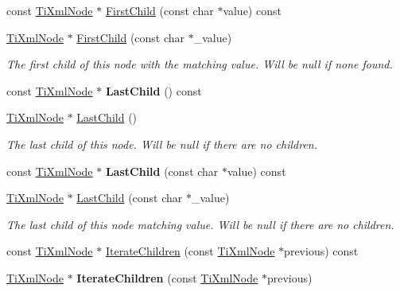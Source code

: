 \begin{DoxyCompactItemize}
\item 
const \hyperlink{classTiXmlNode}{Ti\+Xml\+Node} $\ast$ \hyperlink{classTiXmlNode_ab5f722624113c8203227de4f56576d31}{First\+Child} (const char $\ast$value) const 
\item 
\hyperlink{classTiXmlNode}{Ti\+Xml\+Node} $\ast$ \hyperlink{classTiXmlNode_abc8bf32be6419ec453a731868de19554}{First\+Child} (const char $\ast$\+\_\+value)\hypertarget{classTiXmlNode_abc8bf32be6419ec453a731868de19554}{}\label{classTiXmlNode_abc8bf32be6419ec453a731868de19554}

\begin{DoxyCompactList}\small\item\em The first child of this node with the matching \textquotesingle{}value\textquotesingle{}. Will be null if none found. \end{DoxyCompactList}\item 
const \hyperlink{classTiXmlNode}{Ti\+Xml\+Node} $\ast$ {\bfseries Last\+Child} () const \hypertarget{classTiXmlNode_a6d671107e00cca1d28cb2d7f3a87a21e}{}\label{classTiXmlNode_a6d671107e00cca1d28cb2d7f3a87a21e}

\item 
\hyperlink{classTiXmlNode}{Ti\+Xml\+Node} $\ast$ \hyperlink{classTiXmlNode_a6432d2b2495f6caf9cb4278df706a031}{Last\+Child} ()\hypertarget{classTiXmlNode_a6432d2b2495f6caf9cb4278df706a031}{}\label{classTiXmlNode_a6432d2b2495f6caf9cb4278df706a031}

\begin{DoxyCompactList}\small\item\em The last child of this node. Will be null if there are no children. \end{DoxyCompactList}\item 
const \hyperlink{classTiXmlNode}{Ti\+Xml\+Node} $\ast$ {\bfseries Last\+Child} (const char $\ast$value) const \hypertarget{classTiXmlNode_acdd3fdc436aa7433023310a041e5e63f}{}\label{classTiXmlNode_acdd3fdc436aa7433023310a041e5e63f}

\item 
\hyperlink{classTiXmlNode}{Ti\+Xml\+Node} $\ast$ \hyperlink{classTiXmlNode_abad5bf1059c48127b958711ef89e8e5d}{Last\+Child} (const char $\ast$\+\_\+value)\hypertarget{classTiXmlNode_abad5bf1059c48127b958711ef89e8e5d}{}\label{classTiXmlNode_abad5bf1059c48127b958711ef89e8e5d}

\begin{DoxyCompactList}\small\item\em The last child of this node matching \textquotesingle{}value\textquotesingle{}. Will be null if there are no children. \end{DoxyCompactList}\item 
const \hyperlink{classTiXmlNode}{Ti\+Xml\+Node} $\ast$ \hyperlink{classTiXmlNode_aaef7ac3978c4bb1cc8a24ffae7bced75}{Iterate\+Children} (const \hyperlink{classTiXmlNode}{Ti\+Xml\+Node} $\ast$previous) const 
\item 
\hyperlink{classTiXmlNode}{Ti\+Xml\+Node} $\ast$ {\bfseries Iterate\+Children} (const \hyperlink{classTiXmlNode}{Ti\+Xml\+Node} $\ast$previous)\hypertarget{classTiXmlNode_a2358e747118fdbf0e467b1e4f7d03de1}{}\label{classTiXmlNode_a2358e747118fdbf0e467b1e4f7d03de1}


\end{DoxyCompactItemize}
